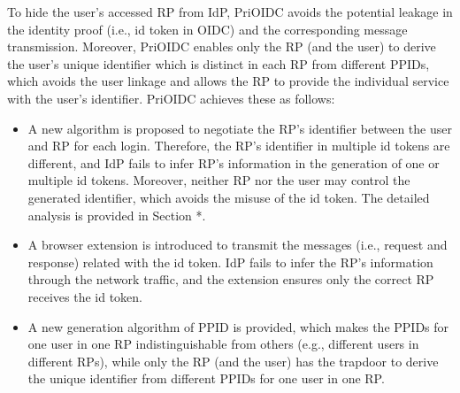 

To hide the user's accessed RP from IdP, PriOIDC avoids the potential leakage in the identity proof (i.e., id token in OIDC)  and the corresponding message transmission. Moreover, PriOIDC enables only the RP (and the user) to derive the user's unique identifier which is distinct in each RP from  different PPIDs,  which avoids the user linkage and allows the RP to provide the individual service with the user's identifier. PriOIDC achieves these as follows: 
\begin{itemize}
\item A new algorithm is proposed to negotiate the RP's identifier between the user and RP for each login. Therefore, the RP's identifier in multiple id tokens are different, and IdP fails to infer RP's information in the generation of one or multiple id tokens. Moreover, neither RP nor the user may control the generated identifier, which avoids the misuse of the id token. The detailed analysis is provided  in Section *.
\item A browser extension is introduced to transmit the messages (i.e.,  request and response) related with the id token. IdP fails to infer the RP's information through the network traffic, and the extension ensures only the correct RP receives the id token.
\item A new generation algorithm of PPID is provided, which makes the PPIDs for one user in one RP  indistinguishable  from others (e.g., different users in different RPs), while only the RP (and the user) has the trapdoor to derive the unique identifier from different PPIDs for one user in one RP.
\end{itemize}

